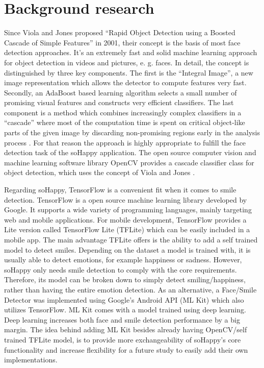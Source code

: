 \section{Background research} \label{sec:background_research}

Since Viola and Jones proposed ``Rapid Object Detection using a Boosted Cascade of Simple Features'' in 2001, their concept is the basis of most face detection approaches.
It's an extremely fast and solid machine learning approach for object detection in videos and pictures, e. g. faces.
In detail, the concept is distinguished by three key components.
The first is the ``Integral Image'', a new image representation which allows the detector to compute features very fast.
Secondly, an AdaBoost based learning algorithm selects a small number of promising visual features and constructs very efficient classifiers.
The last component is a method which combines increasingly complex classifiers in a ``cascade'' where most of the computation time is spent on critical object-like parts of the given image by discarding non-promising regions early in the analysis process \cite{viola_jones}.
For that reason the approach is highly appropriate to fulfill the face detection task of the soHappy application.
The open source computer vision and machine learning software library OpenCV provides a cascade classifier class for object detection, which uses the concept of Viola and Jones \cite{opencv_cascade_classifier}.

Regarding soHappy, TensorFlow \cite{tensorflow} is a convenient fit when it comes to smile detection.
TensorFlow is a open source machine learning library developed by Google.
It supports a wide variety of programming languages, mainly targeting web and mobile applications.
For mobile development, TensorFlow provides a Lite version called TensorFlow Lite (TFLite) which can be easily included in a mobile app.
The main advantage TFLite offers is the ability to add a self trained model to detect smiles.
Depending on the dataset a model is trained with, it is usually able to detect emotions, for example happiness or sadness.
However, soHappy only needs smile detection to comply with the core requirements.
Therefore, its model can be broken down to simply detect smiling/happiness, rather than having the entire emotion detection.
As an alternative, a Face/Smile Detector was implemented using Google's Android API (ML Kit) \cite{mlkit} which also utilizes TensorFlow.
ML Kit comes with a model trained using deep learning.
Deep learning increases both face and smile detection performance by a big margin.
The idea behind adding ML Kit besides already having OpenCV/self trained TFLite model, is to provide more exchangeability of soHappy's core functionality and increase flexibility for a future study to easily add their own implementations.

